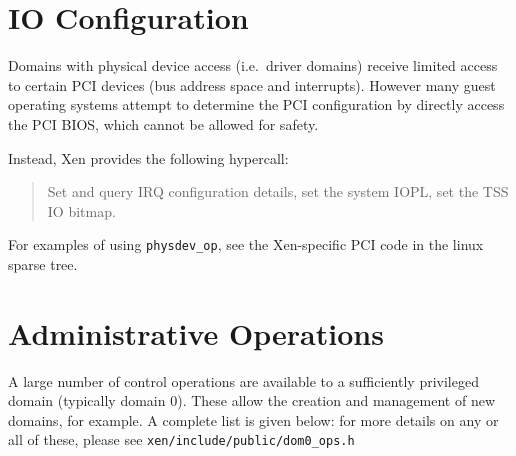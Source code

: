 \documentclass[11pt,twoside,final,openright,a4paper]{report}
\newcommand{\hypercall}[1]{\vspace{2mm}{\sf #1}}
\begin{document}
\section{IO Configuration} 

Domains with physical device access (i.e.\ driver domains) receive
limited access to certain PCI devices (bus address space and
interrupts). However many guest operating systems attempt to 
determine the PCI configuration by directly access the PCI BIOS, 
which cannot be allowed for safety. 

Instead, Xen provides the following hypercall: 

\begin{quote}
\hypercall{physdev\_op(void *physdev\_op)}

Set and query IRQ configuration details, set the system IOPL, set the
TSS IO bitmap.

\end{quote} 


For examples of using {\tt physdev\_op}, see the 
Xen-specific PCI code in the linux sparse tree. 

\section{Administrative Operations}
\label{s:dom0ops}

A large number of control operations are available to a sufficiently
privileged domain (typically domain 0). These allow the creation and
management of new domains, for example. A complete list is given 
below: for more details on any or all of these, please see 
{\tt xen/include/public/dom0\_ops.h} 
\end{document}
